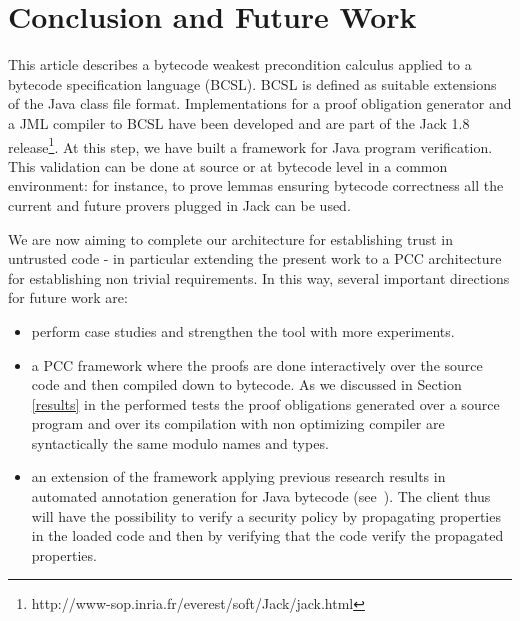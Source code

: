 \section{Conclusion and Future Work}\label{conclusion}
This article describes a bytecode weakest precondition calculus applied to a bytecode specification language (BCSL).
BCSL is defined as suitable extensions of the Java class file format.
Implementations for a proof obligation generator and a JML compiler to BCSL have been developed and are part of the Jack 1.8 release\footnote{http://www-sop.inria.fr/everest/soft/Jack/jack.html}.
At this step, we have built a framework for Java program verification.
 This validation can be done at source or at bytecode level in a common environment: for instance, to prove lemmas ensuring bytecode correctness all the current and future provers plugged in Jack can be used.

We are now aiming to complete our architecture for establishing trust in untrusted code - in particular extending the present work to a PCC architecture for establishing non trivial requirements.  
In this way, several important directions for future work are:
\begin{itemize}
\item perform case studies and strengthen the tool with more experiments.
\item  a PCC framework where the proofs are done interactively over the source code
and then compiled down to bytecode. As we discussed in Section \ref{results} in the performed tests the 
proof obligations generated over a source program and over its compilation with non optimizing compiler are syntactically the same modulo names and types.  
\item an extension of the framework applying previous research results in automated annotation generation for Java bytecode (see~\cite{PBBHL}). The client thus will have the possibility to verify a security policy by propagating properties in the loaded code and then by verifying that the code verify the propagated properties.

\end{itemize}

